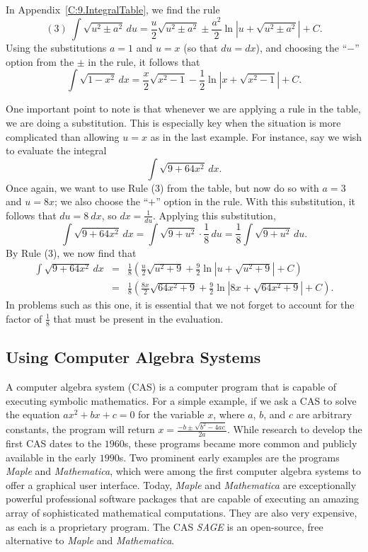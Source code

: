 In Appendix~\ref{C:9.IntegralTable}, we find the rule
$$(3) ~ \int \sqrt{u^2 \pm a^2} \, du = \frac{u}{2}\sqrt{u^2 \pm a^2} \pm \frac{a^2}{2}\ln|u + \sqrt{u^2 \pm a^2}| + C.$$
Using the substitutions $a = 1$ and $u = x$ (so that $du = dx$), and choosing the ``$-$'' option from the $\pm$ in the rule, it follows that 
$$\int \sqrt{1-x^2} \, dx = \frac{x}{2} \sqrt{x^2 - 1} - \frac{1}{2} \ln|x + \sqrt{x^2-1}| + C.$$

One important point to note is that whenever we are applying a rule in the table, we are doing a substitution.  This is especially key when the situation is more complicated than allowing $u = x$ as in the last example.  For instance, say we wish to evaluate the integral
$$\int \sqrt{9 + 64x^2} \, dx.$$
Once again, we want to use Rule (3) from the table, but now do so with $a = 3$ and $u = 8x$; we also choose the ``$+$'' option in the rule.  With this substitution, it follows that $du = 8 \ dx$, so $dx = \frac{1}{du}$.  Applying this substitution, 
$$\int \sqrt{9 + 64x^2} \, dx = \int \sqrt{9 + u^2} \cdot \frac{1}{8} \, du = \frac{1}{8} \int \sqrt{9+u^2} \, du.$$
By Rule (3), we now find that\small
\begin{eqnarray*}
  \int \sqrt{9 + 64x^2} \, dx & = & \frac{1}{8} \left( \frac{u}{2}\sqrt{u^2 + 9} + \frac{9}{2}\ln|u + \sqrt{u^2 + 9}| + C \right) \\
  				& = & \frac{1}{8} \left( \frac{8x}{2}\sqrt{64x^2 + 9} + \frac{9}{2}\ln|8x + \sqrt{64x^2 + 9}| + C \right).
\end{eqnarray*}\normalsize
In problems such as this one, it is essential that we not forget to account for the factor of $\frac{1}{8}$ that must be present in the evaluation.


\subsection*{Using Computer Algebra Systems} 

A computer algebra system (CAS) is a computer program that is capable of executing symbolic mathematics.  For a simple example, if we ask a CAS to solve the equation $ax^2 + bx + c = 0$ for the variable $x$, where $a$, $b$, and $c$ are arbitrary constants, the program will return $x = \frac{-b \pm \sqrt{b^2 - 4ac}}{2a}$.  While research to develop the first CAS dates to the $1960$s, these programs became more common and publicly available in the early $1990$s.  Two prominent early examples are the programs \emph{Maple} and \emph{Mathematica}, which were among the first computer algebra systems to offer a graphical user interface.  Today, \emph{Maple} and \emph{Mathematica} are exceptionally powerful professional software packages that are capable of executing an amazing array of sophisticated mathematical computations.  They are also very expensive, as each is a proprietary program.  The CAS \emph{SAGE} is an open-source, free alternative to \emph{Maple} and \emph{Mathematica}.

